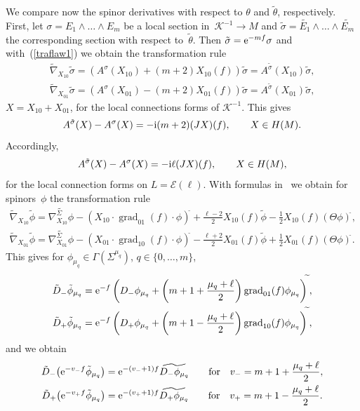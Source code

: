 \documentclass[10pt,a4paper]{amsart}
\numberwithin{equation}{section}
\begin{document}
We compare now the spinor derivatives with respect to $\theta$ and $\tilde{\theta}$, respectively.
First, let
$\sigma= E_1\wedge\dots\wedge E_m$ be a local section in~$\mathcal{K}^{-1}\to M$
and $\tilde{\sigma}= \widetilde{E_1}\wedge\dots\wedge \widetilde{E_m}$ the corresponding section with respect to~$\tilde{\theta}$.
Then $\tilde{\sigma}={\rm e}^{-mf}\sigma$ and with~(\ref{traflaw1}) we obtain the transformation rule
\begin{gather*}
\widetilde{\nabla}_{X_{10}}\tilde{\sigma} = \left(A^\sigma(X_{10}) + (m+2)X_{10}(f) \right) \tilde{\sigma} = A^{\tilde{\sigma}}(X_{10})\tilde{\sigma},\\
\widetilde{\nabla}_{X_{01}}\tilde{\sigma} = \left( A^\sigma(X_{01}) - (m+2)X_{01}(f) \right) \tilde{\sigma} = A^{\tilde{\sigma}}(X_{01})\tilde{\sigma},
\end{gather*}
$X=X_{10}+X_{01}$, for the local connections forms of $\mathcal{K}^{-1}$. This gives
\[ A^{\tilde{\sigma}}(X)- A^{\sigma}(X)=-{\rm i}(m+2) (JX)(f), \qquad X\in H(M).\]
Accordingly,
\[
A^{\tilde{\sigma}}(X)- A^{\sigma}(X) = -{\rm i}\ell (JX)(f),\qquad X\in H(M),
\]
 for the local connection forms on $L=\mathcal{E}(\ell)$.
With formulas in~\cite{LeiN1} we obtain for spinors~$\phi$ the transformation rule
\begin{gather*}
\widetilde{\nabla}_{X_{10}}\tilde{\phi} = \widetilde{\nabla_{X_{10}}^{\Sigma}\phi}-(X_{10}\cdot \operatorname{grad}_{01}(f)\cdot \phi)^{\widetilde{}}
+\frac{\ell-2}{2}X_{10}(f)\tilde{\phi}
-\frac{1}{2}X_{10}(f)(\Theta\phi)^{\widetilde{}},
\\
\widetilde{\nabla}_{X_{01}}\tilde{\phi} = \widetilde{\nabla_{X_{01}}^{\Sigma}\phi}-(X_{01}\cdot \operatorname{grad}_{10}(f)\cdot \phi)^{\widetilde{}}
-\frac{\ell+2}{2}X_{01}(f)\tilde{\phi}
+\frac{1}{2}X_{01}(f)(\Theta\phi)^{\widetilde{}}.
\end{gather*}
This gives for $\phi_{\mu_q}\in\Gamma(\Sigma^{\mu_q})$, $q\in\{0,\dots,m\}$,
\begin{gather*}
\tilde{D}_-\tilde{\phi}_{\mu_q} = {\rm e}^{-f}\left( D_-\phi_{\mu_q}
+ \left(m+1+\frac{\mu_q+\ell}{2}\right) \operatorname{grad}_{01}(f) \phi_{\mu_q} \right)^{\widetilde{}},
\\
\tilde{D}_+\tilde{\phi}_{\mu_q} = {\rm e}^{-f}\left( D_+\phi_{\mu_q}
+ \left(m+1-\frac{\mu_q+\ell}{2}\right) \operatorname{grad}_{10}(f) \phi_{\mu_q} \right)^{\widetilde{}},
\end{gather*}
and we obtain
\begin{gather*}
\tilde{D}_- \big({\rm e}^{-v_- f}\tilde{\phi}_{\mu_q}\big) = {\rm e}^{-(v_-+1)f} \widetilde{D_-\phi_{\mu_q}}\qquad
\mbox{for}\quad v_-=m+1+\frac{\mu_{q}+\ell}{2},\\
\tilde{D}_+ \big({\rm e}^{-v_+ f}\tilde{\phi}_{\mu_q}\big) = {\rm e}^{-(v_++1)f} \widetilde{D_+\phi_{\mu_q}}\qquad
\mbox{for}\quad v_+=m+1-\frac{\mu_{q}+\ell}{2}.
\end{gather*}
\end{document}
